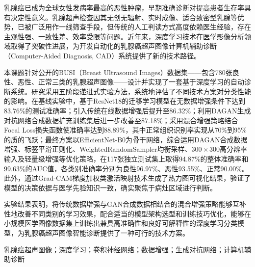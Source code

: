 \abstractch

乳腺癌已成为全球女性发病率最高的恶性肿瘤，早期准确诊断对提高患者生存率具有决定性意义。乳腺超声检查因其无创无辐射、实时成像、适合致密型乳腺等优势，已被广泛用作一线筛查手段，但传统的人工判读方式高度依赖医生经验，存在主观性强、一致性差、效率受限等问题。近年来，深度学习技术在医学影像分析领域取得了突破性进展，为开发自动化的乳腺癌超声图像计算机辅助诊断（Computer-Aided Diagnosis, CAD）系统提供了新的技术路径。

本课题针对公开的BUSI（Breast Ultrasound Images）数据集——包含780张良性、恶性、正常三类的乳腺超声图像——设计并实现了一套基于深度学习的自动诊断系统。研究采用五阶段递进式实验方法，系统地评估了不同技术方案对分类性能的影响。在基线实验中，基于ResNet18的迁移学习模型在无数据增强条件下达到83.76\%的测试准确率；引入传统在线数据增强后提升至86.32\%；利用DAGAN生成对抗网络合成数据扩充训练集后进一步改善至87.18\%；采用混合增强策略结合Focal Loss损失函数使准确率达到88.89\%，其中正常组织识别率实现从70\%到95\%的质的飞跃；最终方案以EfficientNet-B0为骨干网络，综合运用DAGAN合成数据增强、标签平滑正则化、WeightedRandomSampler均衡采样、$300\times300$高分辨率输入及轻量级增强等优化策略，在117张独立测试集上取得94.87\%的整体准确率和99.63\%的AUC值，各类别准确率分别为良性96.97\%、恶性93.55\%、正常90.00\%。此外，通过Grad-CAM梯度加权类激活映射技术生成了热力图可视化结果，验证了模型的决策依据与医学先验知识一致，确实聚焦于病灶区域进行判断。

实验结果表明，将传统数据增强与GAN合成数据相结合的混合增强策略能够互补性地改善不同类别的学习效果，配合适当的模型架构选型和训练技巧优化，能够在小规模医学图像数据集上训练出兼具高准确性和良好可解释性的深度学习分类模型，为乳腺癌超声图像智能诊断提供了一种可行的技术方案。


\vspace{5pt}

\keywordsch 乳腺癌超声图像；深度学习；卷积神经网络；数据增强；生成对抗网络；计算机辅助诊断
